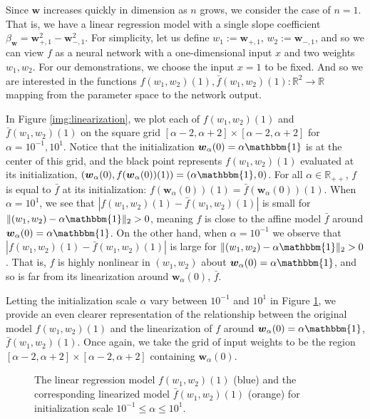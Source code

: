 \documentclass{article}
\begin{document}
Since $\boldsymbol{w}$ increases quickly in dimension as $n$ grows, we consider the case of $n =1$. That is, we have a linear regression model with a single slope coefficient $\beta_{\boldsymbol{w}} = \boldsymbol{w}_{+, 1}^2 - \boldsymbol{w}_{-, 1}^2$. For simplicity, let us define $w_1 := \boldsymbol{w}_{+, 1}$, $w_2 := \boldsymbol{w}_{-, 1}$, and so we can view $f$ as a neural network with a one-dimensional input $x$ and two weights $w_1, w_2$. For our demonstrations, we choose the input $x = 1$ to be fixed. And so we are interested in the functions $f(w_1, w_2)(1), \bar{f}(w_1, w_2)(1): \mathbb{R}^2 \rightarrow \mathbb{R}$ mapping from the parameter space to the network output.

In Figure \ref{img:linearization}, we plot each of $f(w_1, w_2)(1)$ and $\bar{f}(w_1, w_2)(1)$ on the square grid $[\alpha - 2, \alpha + 2] \times [\alpha - 2, \alpha + 2]$ for $\alpha = 10^{-1}, 10^1$. Notice that the initialization $\boldsymbol{w}_{\alpha}(0) = \alpha \mathbbm{1}$ is at the center of this grid, and the black point represents $f(w_1, w_2)(1)$ evaluated at its initialization, $(\boldsymbol{w}_{\alpha}(0), f(\boldsymbol{w}_{\alpha}(0))(1)) = (\alpha \mathbbm{1}, 0)$. For all $\alpha \in \mathbb{R}_{++}$, $f$ is equal to $\bar{f}$ at its initialization: $f(\boldsymbol{w}_{\alpha}(0))(1) = \bar{f}(\boldsymbol{w}_{\alpha}(0))(1)$. When $\alpha = 10^1$, we see that $|f(w_1, w_2)(1) - \bar{f}(w_1, w_2)(1) |$ is small for $\| (w_1, w_2) - \alpha \mathbbm{1} \|_2 > 0$, meaning $f$ is close to the affine model $\bar{f}$ around $\boldsymbol{w}_{\alpha}(0) = \alpha \mathbbm{1}$. On the other hand, when $\alpha = 10^{-1}$ we observe that $|f(w_1, w_2)(1) - \bar{f}(w_1, w_2)(1)|$ is large for $\| (w_1, w_2) - \alpha \mathbbm{1} \|_2 > 0$. That is, $f$ is highly nonlinear in $(w_1, w_2)$ about $\boldsymbol{w}_{\alpha}(0) = \alpha \mathbbm{1}$, and so is far from its linearization around $\boldsymbol{w}_{\alpha}(0)$, $\bar{f}$.

Letting the initialization scale $\alpha$ vary between $10^{-1}$ and $10^{1}$ in Figure \ref{gif:linearization}, we provide an even clearer representation of the relationship between the original model $f(w_1, w_2)(1)$ and the linearization of $f$ around $\boldsymbol{w}_{\alpha}(0) = \alpha \mathbbm{1}$, $\bar{f}(w_1, w_2)(1)$. Once again, we take the grid of input weights to be the region $[\alpha - 2, \alpha + 2] \times [\alpha - 2, \alpha + 2]$ containing $\boldsymbol{w}_{\alpha}(0)$.

\begin{figure}[H]
\caption{The linear regression model $f(w_1, w_2)(1)$ (blue) and the corresponding linearized model $\bar{f}(w_1, w_2)(1)$ (orange) for initialization scale $10^{-1} \leq \alpha \leq 10^1$.}\label{gif:linearization}
\end{figure}
\end{document}
